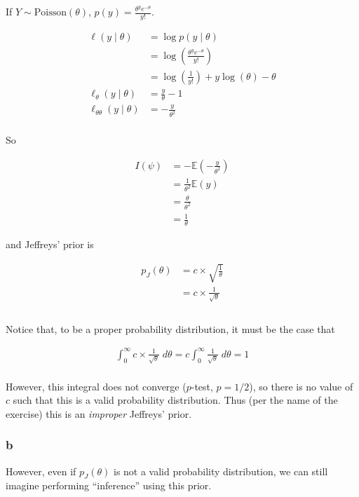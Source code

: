 \documentclass[]{article}
\begin{document}
If \(Y \sim \text{Poisson}(\theta)\),
\(p(y) = \frac{\theta^y e^{-\theta}}{y!}\).

\begin{align}
\ell(y \mid \theta) &= \log p(y \mid \theta) \\
&= \log \left( \frac{\theta^y e^{-\theta}}{y!} \right) \\
&= \log \left( \frac{1}{y!} \right) + y \log (\theta) - \theta \\
\ell_\theta(y \mid \theta) &= \frac{y}{\theta} - 1\\
\ell_{\theta \theta}(y \mid \theta) &= -\frac{y}{\theta^2} \\
\end{align}

So

\begin{align}
I(\psi) &= -\mathbb{E}\left( - \frac{y}{\theta^2} \right) \\
&= \frac{1}{\theta^2} \mathbb{E}(y) \\
&= \frac{\theta}{\theta^2} \\
&= \frac{1}{\theta}
\end{align}

and Jeffreys' prior is

\begin{align}
p_J(\theta) &= c \times \sqrt{\frac{1}{\theta}} \\
&= c \times \frac{1}{\sqrt{\theta}}\\\\
\end{align}

Notice that, to be a proper probability distribution, it must be the
case that

\begin{align}
\int_0^{\infty} c \times \frac{1}{\sqrt{\theta}} \; d\theta = c \int_0^{\infty} \frac{1}{\sqrt{\theta}} \; d\theta = 1\\
\end{align}

However, this integral does not converge (\(p\)-test, \(p = 1/2\)), so
there is no value of \(c\) such that this is a valid probability
distribution. Thus (per the name of the exercise) this is an
\emph{improper} Jeffreys' prior.

\hypertarget{b-7}{%
\subsubsection{b}\label{b-7}}

However, even if \(p_J(\theta)\) is not a valid probability
distribution, we can still imagine performing ``inference'' using this
prior.
\end{document}
